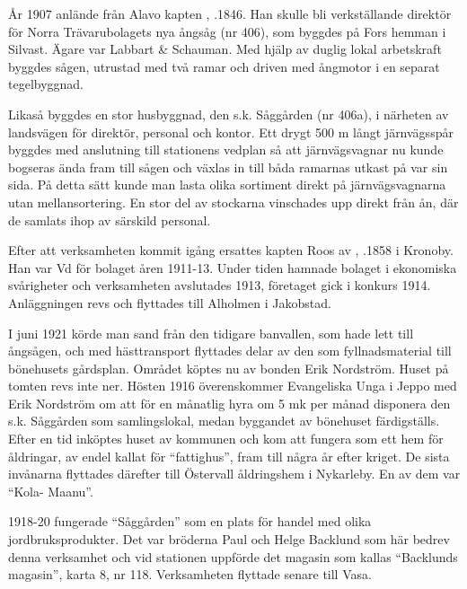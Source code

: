 
\jhnooccupant

År 1907 anlände från Alavo kapten , .1846. Han skulle bli verkställande direktör för Norra Trävarubolagets nya ångsåg (nr 406), som byggdes på Fors hemman i Silvast. Ägare var Labbart \& Schauman. Med hjälp av duglig lokal arbetskraft byggdes sågen, utrustad med två ramar och driven med ångmotor i en separat tegelbyggnad.

Likaså byggdes en stor husbyggnad, den s.k. Såggården (nr 406a), i närheten av landsvägen för direktör, personal och kontor. Ett drygt 500 m långt järnvägsspår byggdes med anslutning till stationens vedplan så att järnvägsvagnar nu kunde bogseras ända fram till sågen och växlas in till båda ramarnas utkast på var sin sida. På detta sätt kunde man lasta olika sortiment direkt på järnvägsvagnarna utan mellansortering. En stor del av stockarna vinschades upp direkt från ån, där de samlats ihop av särskild personal.



Efter att verksamheten kommit igång ersattes kapten Roos av , .1858 i Kronoby. Han var Vd för bolaget åren 1911-13. Under tiden hamnade bolaget i ekonomiska svårigheter och verksamheten avslutades 1913, företaget gick i konkurs 1914. Anläggningen revs och flyttades till Alholmen i Jakobstad.

I juni 1921 körde man sand från den tidigare banvallen, som hade lett till ångsågen, och med hästtransport flyttades delar av den som fyllnadsmaterial till bönehusets gårdsplan. Området köptes nu av bonden Erik Nordström. Huset på tomten revs inte ner. Hösten 1916 överenskommer Evangeliska Unga i Jeppo med Erik Nordström  om att för en månatlig hyra om 5 mk per månad disponera den s.k. Såggården som samlingslokal, medan byggandet av bönehuset färdigställs. Efter en tid inköptes huset av kommunen och kom att fungera som ett hem för åldringar, av endel kallat för ``fattighus'', fram till några år efter kriget. De sista invånarna flyttades därefter till Östervall åldringshem i Nykarleby. En av dem var ``Kola- Maanu''.

1918-20 fungerade ``Såggården'' som en plats för handel med olika jordbruksprodukter. Det var bröderna Paul och Helge Backlund som här bedrev denna verksamhet och vid stationen uppförde det magasin som kallas ``Backlunds magasin'', karta 8, nr 118. Verksamheten flyttade senare till Vasa.

